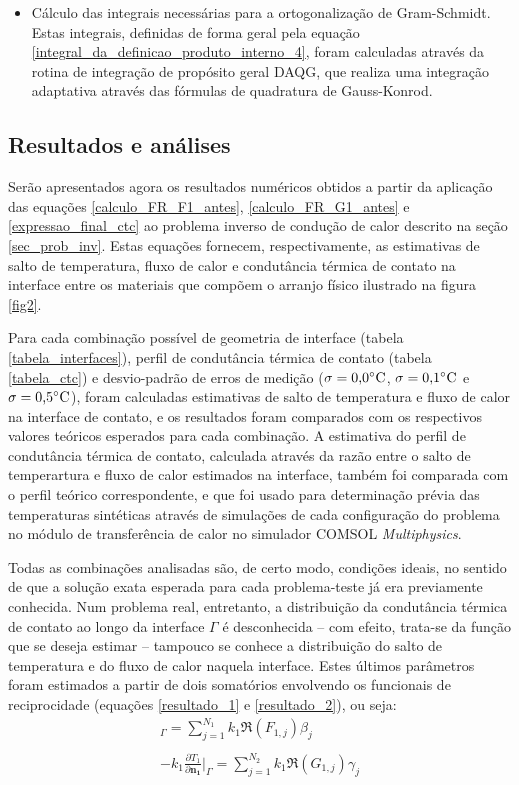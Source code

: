 \begin{itemize}
	\item Cálculo das integrais necessárias para a ortogonalização de Gram-Schmidt. Estas integrais, definidas de forma geral pela equação \eqref{integral_da_definicao_produto_interno_4}, foram calculadas através da rotina de integração de propósito geral DAQG, que realiza uma integração adaptativa através das fórmulas de quadratura de Gauss-Konrod.
\end{itemize}

\subsection{Resultados e análises}

Serão apresentados agora os resultados numéricos obtidos a partir da aplicação das equações \eqref{calculo_FR_F1_antes}, \eqref{calculo_FR_G1_antes} e \eqref{expressao_final_ctc} ao problema inverso de condução de calor descrito na seção \ref{sec_prob_inv}. Estas equações fornecem, respectivamente, as estimativas de salto de temperatura, fluxo de calor e condutância térmica de contato na interface entre os materiais que compõem o arranjo físico ilustrado na figura \ref{fig2}.

Para cada combinação possível de geometria de interface (tabela \ref{tabela_interfaces}), perfil de condutância térmica de contato (tabela \ref{tabela_ctc}) e desvio-padrão de erros de medição ($\sigma = \text{0,0}\celsius$, $\sigma = \text{0,1}\celsius$ e $\sigma = \text{0,5}\celsius$), foram calculadas estimativas de salto de temperatura e fluxo de calor na interface de contato, e os resultados foram comparados com os respectivos valores teóricos esperados para cada combinação. A estimativa do perfil de condutância térmica de contato, calculada através da razão entre o salto de temperartura e fluxo de calor estimados na interface, também foi comparada com o perfil teórico correspondente, e que foi usado para determinação prévia das temperaturas sintéticas através de simulações de cada configuração do problema no módulo de transferência de calor no simulador COMSOL \textit{Multiphysics}\textsuperscript{\textregistered}.

Todas as combinações analisadas são, de certo modo, condições ideais, no sentido de que a solução exata esperada para cada problema-teste já era previamente conhecida. Num problema real, entretanto, a distribuição da condutância térmica de contato ao longo da interface $\Gamma$ é desconhecida -- com efeito, trata-se da função que se deseja estimar -- tampouco se conhece a distribuição do salto de temperatura e do fluxo de calor naquela interface. Estes últimos parâmetros foram estimados a partir de dois somatórios envolvendo os funcionais de reciprocidade (equações \eqref{resultado_1} e \eqref{resultado_2}), ou seja:
\begin{align}
[T_1 - T_2]_\Gamma = \sum_{j=1}^{N_1} k_1 \Re(F_{1,j}) \beta_j \label{resultado_1_again} \\ \nonumber \\
- k_1 \frac{\partial T_1}{\partial\mathbf{n_1}}\bigg|_\Gamma = \sum_{j=1}^{N_2} k_1 \Re(G_{1,j}) \gamma_j \label{resultado_2_again}
\end{align}

